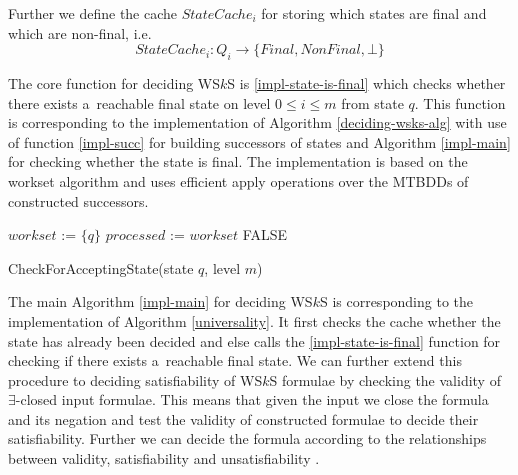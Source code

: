  Further we define the cache $\mathit{StateCache}_i$ for storing which states
 are final and which are non-final, i.e.
 \begin{equation}
  \mathit{StateCache}_i : Q_i \rightarrow \{Final, NonFinal, \bot\}
 \end{equation}
 
 The core function for deciding WS$k$S is \ref{impl-state-is-final} which checks
 whether there exists a~reachable final state on level $0 \leq i \leq m$ from
 state $q$. This function is corresponding to the implementation of Algorithm
 \ref{deciding-wsks-alg} with use of function \ref{impl-succ} for building successors of
 states and Algorithm \ref{impl-main} for checking whether the state is final.
 The implementation is based on the workset algorithm and uses efficient apply
 operations over the MTBDDs of constructed successors.
 
\begin{function}[ht!]
		\BlankLine
		\nl $\mathit{workset}$ := $\{q\}$\;
		\nl $\mathit{processed}$ := $\mathit{workset}$\;
		\nl {}
			\nl\Return \textsc{FALSE}\;
		\caption{CheckForAcceptingState(state $q$, level
		$m$)}\label{impl-state-is-final}
\end{function}
 
 The main Algorithm \ref{impl-main} for deciding WS$k$S is corresponding to the
 implementation of Algorithm \ref{universality}. It first checks the cache
 whether the state has already been decided and else calls the
 \ref{impl-state-is-final} function for checking if there exists a~reachable
 final state.
 We can further extend this procedure to deciding satisfiability of WS$k$S
 formulae by checking the validity of $\exists$-closed input formulae. This
 means that given the input we close the formula and its negation and test the
 validity of constructed formulae to decide their satisfiability. Further we can
 decide the formula according to the relationships between validity,
 satisfiability and unsatisfiability \cite{logics}.
 
